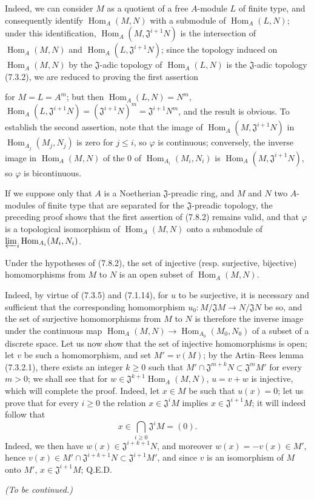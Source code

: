 Indeed, we can consider $M$ as a quotient of a free $A$-module $L$ of
finite type, and consequently identify $\operatorname{Hom}_A(M,N)$ with a submodule of
$\operatorname{Hom}_A(L,N)$; under this identification,
$\operatorname{Hom}_A(M,\mathfrak J^{i+1}N)$ is the intersection of $\operatorname{Hom}_A(M,N)$ and
$\operatorname{Hom}_A(L,\mathfrak J^{i+1}N)$; since the topology induced on
$\operatorname{Hom}_A(M,N)$ by the $\mathfrak J$-adic topology of $\operatorname{Hom}_A(L,N)$ is
the $\mathfrak J$-adic topology (7.3.2), we are reduced to proving the
first assertion


for $M=L=A^m$; but then $\operatorname{Hom}_A(L,N)=N^m$,
$\operatorname{Hom}_A(L,\mathfrak J^{i+1}N)=(\mathfrak J^{i+1}N)^m=
\mathfrak J^{i+1}N^m$, and the result is obvious. To establish the second
assertion, note that the image of $\operatorname{Hom}_A(M,\mathfrak J^{i+1}N)$ in
$\operatorname{Hom}_{A_j}(M_j,N_j)$ is zero for $j\leq i$, so $\varphi$ is
continuous; conversely, the inverse image in $\operatorname{Hom}_A(M,N)$ of the $0$ of
$\operatorname{Hom}_{A_i}(M_i,N_i)$ is $\operatorname{Hom}_A(M,\mathfrak J^{i+1}N)$, so $\varphi$
is bicontinuous.

If we suppose only that $A$ is a Noetherian $\mathfrak J$-preadic
ring, and $M$ and $N$ two $A$-modules of finite type that are separated for the
$\mathfrak J$-preadic topology, the preceding proof shows that
the first assertion of (7.8.2) remains valid, and that $\varphi$ is a
topological isomorphism of $\operatorname{Hom}_A(M,N)$ onto a submodule of
$\varprojlim_i\operatorname{Hom}_{A_i}(M_i,N_i)$.

\begin{proposition}[7.8.3]
\label{0.7.8.3}
Under the hypotheses of (7.8.2), the set of injective (resp. surjective,
bijective) homomorphisms from $M$ to $N$ is an open subset of
$\operatorname{Hom}_A(M,N)$.
\end{proposition}

Indeed, by virtue of (7.3.5) and (7.1.14), for $u$ to be surjective, it is
necessary and sufficient that the corresponding homomorphism
$u_0:M/\mathfrak JM\to N/\mathfrak JN$ be so, and the set of
surjective homomorphisms from $M$ to $N$ is therefore the inverse image under
the continuous map $\operatorname{Hom}_A(M,N)\to\operatorname{Hom}_{A_0}(M_0,N_0)$ of a subset
of a discrete space. Let us now show that the set of injective homomorphisms
is open; let $v$ be such a homomorphism, and set $M'=v(M)$;
by the Artin--Rees lemma (7.3.2.1), there exists an integer $k\geq 0$ such that
$M'\cap\mathfrak J^{m+k}N\subset\mathfrak J^mM'$ for every $m>0$; we
shall see that for $w\in\mathfrak J^{k+1}\operatorname{Hom}_A(M,N)$,
$u=v+w$ is injective, which will complete the proof. Indeed, let
$x\in M$ be such that $u(x)=0$; let us prove that for every $i\geq 0$ the relation
$x\in\mathfrak J^iM$ implies $x\in\mathfrak J^{i+1}M$; it will indeed
follow that
\[
  x\in\bigcap_{i\geq 0}\mathfrak J^iM=(0).
\]
Indeed, we then have $w(x)\in\mathfrak J^{i+k+1}N$, and moreover
$w(x)=-v(x)\in M'$, hence
$v(x)\in M'\cap\mathfrak J^{i+k+1}N\subset\mathfrak J^{i+1}M'$, and since
$v$ is an isomorphism of $M$ onto $M'$, $x\in\mathfrak J^{i+1}M$;
Q.E.D.

\begin{flushright}
\emph{(To be continued.)}
\end{flushright}

